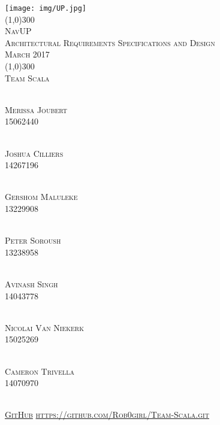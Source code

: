 \documentclass[runningheads,a4paper]{article}
\begin{document}
	
	\begin{titlepage}
		\begin{center}
			\texttt{[image: img/UP.jpg]}  \\
			[1cm]
			\line(1,0){300} \\
			[0.3cm]
			\textsc{\Large
				NavUP\\
				Architectural Requirements Specifications and Design \\
				\hfill {} March 2017
			}\\
			[0.1cm]
			\line(1,0){300} \\
			[0.7cm]
			\textsc{\Large
				Team Scala
			} \\
			
			
			
		\end{center}
		
		\begin{center}
			\begin{multicols}{2}
				\textsc{\large\\
					Merissa Joubert \\ 
					15062440\\ 
				}
				
				\textsc{\large\\
					Joshua Cilliers \\
					14267196\\ 
				}
				
				\textsc{\large\\
					Gershom Maluleke \\
					13229908\\ 
				}
				
				\textsc{\large\\
					Peter Soroush\\
					13238958\\ 
				}
				
				\columnbreak
				
				\textsc{\large\\
					Avinash Singh\\
					14043778\\
				}
				
				\textsc{\large\\
					Nicolai Van Niekerk\\
					15025269\\
				}
				
				\textsc{\large\\
					Cameron Trivella\\
					14070970\\ 
				}
				
			\end{multicols}
			
			
			\textsc{	\\ \href{https://github.com/Rob0girl/Team-Scala.git}{GitHub}
				\url{https://github.com/Rob0girl/Team-Scala.git}}
			
		\end{center}
	\end{titlepage}
	
\end{document}
